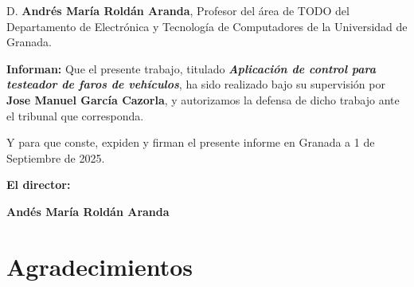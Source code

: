D. \textbf{Andrés María Roldán Aranda}, Profesor del área de TODO del Departamento de Electrónica y Tecnología de Computadores de la Universidad de Granada.

\vspace{0.5cm}

\textbf{Informan:}
Que el presente trabajo, titulado \textit{\textbf{Aplicación de control para testeador de faros de vehículos}}, ha sido realizado bajo su supervisión por \textbf{Jose Manuel García Cazorla}, y autorizamos la defensa de dicho trabajo ante el tribunal que corresponda.

\vspace{0.5cm}

Y para que conste, expiden y firman el presente informe en Granada a 1 de Septiembre de 2025.

\vspace{1cm}

\textbf{El director:}

\vspace{5cm}

\noindent\textbf{Andés María Roldán Aranda}

\chapter*{Agradecimientos}
\thispagestyle{empty}

\vspace{1cm}


